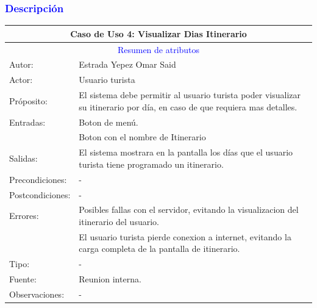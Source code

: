 \subsubsection{\textcolor{blue}{Descripción}}
\begin{tabularx}{16cm}{||l|X||}
	\hline
	\multicolumn{2}{||c||}{Caso de Uso 4: Visualizar Dias Itinerario} \\
	\hline
	\multicolumn{2}{||c||}{\textcolor{blue}{Resumen de atributos}} \\
	\hline
	{Autor:} & Estrada Yepez Omar Said \\
    \hline
	{Actor:} & Usuario turista\\
	\hline
	{Próposito:} & El sistema debe permitir al usuario turista poder visualizar su itinerario por día, en caso de que requiera mas detalles.\\
	\hline
	{Entradas:} &  Boton de menú. \\
    &Boton con el nombre de Itinerario\\
	\hline
	{Salidas:} & El sistema mostrara en la pantalla los días que el usuario turista tiene programado un itinerario.\\
	\hline
	{Precondiciones:} & -\\ 
	\hline
	{Postcondiciones:}& - \\
	\hline
	{Errores:} & Posibles fallas con el servidor, evitando la visualizacion del itinerario del usuario. \\
    & El usuario turista pierde conexion a internet, evitando la carga completa de la pantalla de itinerario.\\
	\hline
	{Tipo:} & -\\
	\hline
	{Fuente:} & Reunion interna. \\
	\hline
	{Observaciones:} & {-} \\
	\hline
\end{tabularx}

\pagebreak
